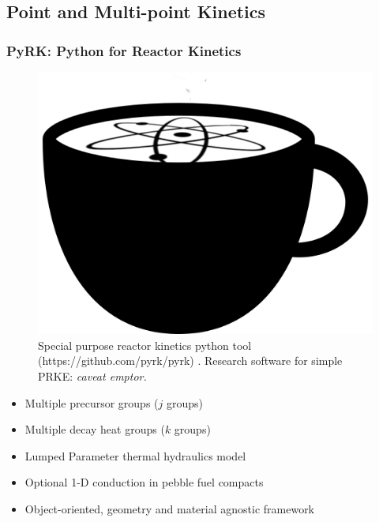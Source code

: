\subsection{Point and Multi-point Kinetics}
\begin{frame}
        \frametitle{PyRK: Python for Reactor Kinetics}

               \begin{figure}[t]
                \vspace*{-0.1in}
                \includegraphics[height=0.5\textheight]{./images/pyrk.png}
                       \caption{Special purpose reactor kinetics python tool
                       (https://github.com/pyrk/pyrk) \cite{huff_pyrk:_2015}. 
                       Research software for simple PRKE: \emph{caveat emptor.}}
               \end{figure}

               \begin{itemize}
                       \item Multiple precursor groups ($j$ groups)
                       \item Multiple decay heat groups ($k$ groups)
                       \item Lumped Parameter thermal hydraulics model
                       \item Optional 1-D conduction in pebble fuel compacts
                       \item Object-oriented, geometry and material agnostic framework
               \end{itemize}
\end{frame}


